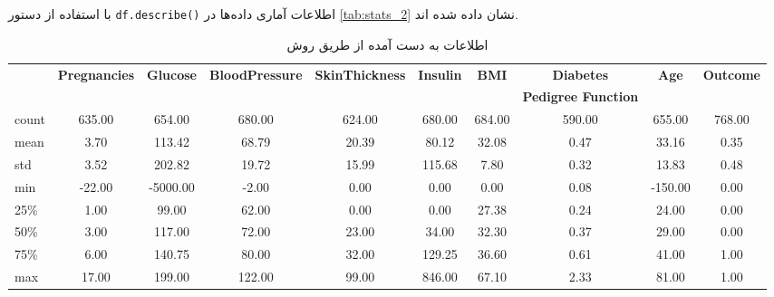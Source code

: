 \documentclass[11pt]{article}
\begin{document}
		با استفاده از دستور 
	\verb|df.describe()|
	اطلاعات آماری داده‌ها در 
	\autoref{tab:stats_2}
	نشان داده شده اند.
	\begin{table}[h!]
		\caption{اطلاعات به دست آمده از طریق روش }
		\begin{latin}
		{\scriptsize
		\centering
		\begin{tabular}{lccccccccc}
			\toprule
		 & \textbf{Pregnancies} & \textbf{Glucose} & \textbf{BloodPressure} & \textbf{SkinThickness} & \textbf{Insulin} & \textbf{BMI} & \textbf{Diabetes} & \textbf{Age} & \textbf{Outcome}\\ 
		&  &  &  &  &  &  & \textbf{Pedigree Function} &  &  \\ 
		\midrule
		count & 635.00 & 654.00 & 680.00 & 624.00 & 680.00 & 684.00 & 590.00 & 655.00 & 768.00 \\ 
		mean & 3.70 & 113.42 & 68.79 & 20.39 & 80.12 & 32.08 & 0.47 & 33.16 & 0.35 \\ 
		std & 3.52 & 202.82 & 19.72 & 15.99 & 115.68 & 7.80 & 0.32 & 13.83 & 0.48 \\ 
		min & -22.00 & -5000.00 & -2.00 & 0.00 & 0.00 & 0.00 & 0.08 & -150.00 & 0.00 \\ 
		25\% & 1.00 & 99.00 & 62.00 & 0.00 & 0.00 & 27.38 & 0.24 & 24.00 & 0.00 \\ 
		50\% & 3.00 & 117.00 & 72.00 & 23.00 & 34.00 & 32.30 & 0.37 & 29.00 & 0.00 \\ 
		75\% & 6.00 & 140.75 & 80.00 & 32.00 & 129.25 & 36.60 & 0.61 & 41.00 & 1.00 \\ 
		max & 17.00 & 199.00 & 122.00 & 99.00 & 846.00 & 67.10 & 2.33 & 81.00 & 1.00 \\ 
			\bottomrule
		\end{tabular}
		}
		\end{latin}
		\label{tab:stats_2}
	\end{table}
	
\end{document}
